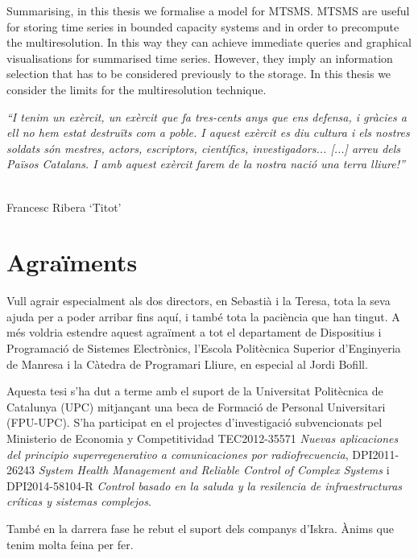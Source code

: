 Summarising, in this thesis we formalise a model for \gls{MTSMS}.
\gls{MTSMS} are useful for storing time series in bounded capacity
systems and in order to precompute the multiresolution. In this way
they can achieve immediate queries and graphical visualisations for
summarised time series.  However, they imply an information selection
that has to be considered previously to the storage. In this thesis we
consider the limits for the multiresolution technique.






\newpage


\begin{flushright}
\parbox[b]{0.6\textwidth}{
\emph{
``I tenim un exèrcit, un exèrcit que fa tres-cents anys que ens defensa, i gràcies a ell no hem estat destruïts com a poble. I aquest exèrcit es diu cultura i els nostres soldats són mestres, actors, escriptors, científics, investigadors... [...] arreu dels Països Catalans. I amb aquest exèrcit farem de la nostra nació una terra lliure!''}
}\\ Francesc Ribera `Titot'
\end{flushright}


\section*{Agraïments}

Vull agrair especialment als dos directors, en Sebastià i la Teresa,
tota la seva ajuda per a poder arribar fins aquí, i també tota la
paciència que han tingut. A més voldria estendre aquest agraïment a tot el
departament de Dispositius i Programació de Sistemes Electrònics,
l'Escola Politècnica Superior d'Enginyeria de Manresa i la Càtedra de
Programari Lliure, en especial al Jordi Bofill. 

Aquesta tesi s'ha dut a terme amb el suport de la Universitat
Politècnica de Catalunya (UPC) mitjançant una beca de Formació de
Personal Universitari (FPU-UPC). S'ha participat en el projectes
d'investigació subvencionats pel Ministerio de Economia y
Competitividad TEC2012-35571 \emph{Nuevas aplicaciones del principio
  superregenerativo a comunicaciones por radiofrecuencia},
DPI2011-26243 \emph{System Health Management and Reliable Control of
  Complex Systems} i DPI2014-58104-R \emph{Control basado en la saluda
  y la resilencia de infraestructuras críticas y sistemas complejos}.


També en la darrera fase he rebut el suport dels companys
d'Iskra. Ànims que tenim molta feina per fer.


